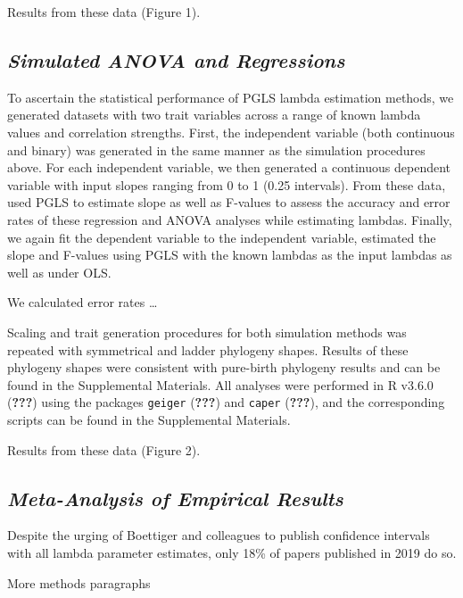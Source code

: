 \documentclass[]{article}
\begin{document}
Results from these data (Figure 1).

\subsection{\texorpdfstring{\emph{Simulated ANOVA and
Regressions}}{Simulated ANOVA and Regressions}}\label{simulated-anova-and-regressions}

To ascertain the statistical performance of PGLS lambda estimation
methods, we generated datasets with two trait variables across a range
of known lambda values and correlation strengths. First, the independent
variable (both continuous and binary) was generated in the same manner
as the simulation procedures above. For each independent variable, we
then generated a continuous dependent variable with input slopes ranging
from 0 to 1 (0.25 intervals). From these data, used PGLS to estimate
slope as well as F-values to assess the accuracy and error rates of
these regression and ANOVA analyses while estimating lambdas. Finally,
we again fit the dependent variable to the independent variable,
estimated the slope and F-values using PGLS with the known lambdas as
the input lambdas as well as under OLS. \hfill\break

We calculated error rates \ldots{} \hfill\break

Scaling and trait generation procedures for both simulation methods was
repeated with symmetrical and ladder phylogeny shapes. Results of these
phylogeny shapes were consistent with pure-birth phylogeny results and
can be found in the Supplemental Materials. All analyses were performed
in R v3.6.0 ({\textbf{???}}) using the packages \texttt{geiger}
({\textbf{???}}) and \texttt{caper} ({\textbf{???}}), and the
corresponding scripts can be found in the Supplemental Materials.
\hfill\break

Results from these data (Figure 2).

\subsection{\texorpdfstring{\emph{Meta-Analysis of Empirical
Results}}{Meta-Analysis of Empirical Results}}\label{meta-analysis-of-empirical-results}

Despite the urging of Boettiger and colleagues to publish confidence
intervals with all lambda parameter estimates, only 18\% of papers
published in 2019 do so. \hfill\break

More methods paragraphs \hfill\break
\end{document}
